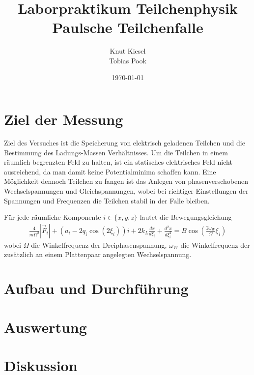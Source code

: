 \documentclass[a4paper,12pt]{article}
\title{Laborpraktikum Teilchenphysik\\ Paulsche Teilchenfalle}
\author{Knut Kiesel\\Tobias Pook}
\date{\today}
\begin{document}
\maketitle
\thispagestyle{empty}
\newpage
\tableofcontents
\setcounter{page}{1}
\newpage

\section{Ziel der Messung} %
Ziel des Versuches ist die Speicherung von elektrisch geladenen Teilchen und die Bestimmung des Ladungs-Massen Verhältnisses.
Um die Teilchen in einem räumlich begrenzten Feld zu halten, ist ein statisches elektrisches Feld nicht ausreichend, da man damit keine Potentialminima schaffen kann.
Eine Möglichkeit dennoch Teilchen zu fangen ist das Anlegen von phasenverschobenen Wechselspannungen und Gleichspannungen, wobei bei richtiger Einstellungen der Spannungen und Frequenzen die Teilchen stabil in der Falle bleiben.

Für jede räumliche Komponente $i\in\{x,y,z\}$ lautet die Bewegungsgleichung
\begin{align*}
	\frac{4}{mΩ^2} |\vec{F}_i| + \left( a_i -2q_i \cos\left( 2\xi_i \right) \right) i  + 2k_L \frac{dx}{d\xi_i} + \frac{d^2x}{d\xi_i^2} = B\cos\left( \frac{2ω_W}{Ω}ξ_i \right)
\end{align*}
wobei $Ω$ die Winkelfrequenz der Dreiphasenspannung, $ω_W$ die Winkelfrequenz der zusätzlich an einem Plattenpaar angelegten Wechselspannung.


\section{Aufbau und Durchführung}


\section{Auswertung}
\section{Diskussion}

\begin{figure}[htb]
		\centering
		\label{fig:lhc}
\end{figure}
\FloatBarrier







\end{document}
